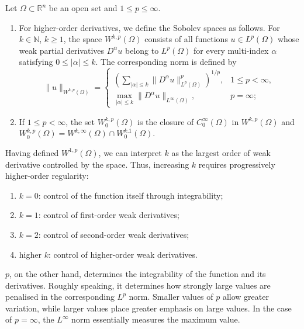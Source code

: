 \begin{definition}
    \label{def: Sobolev general k}
    Let $\Omega \subset \mathbb{R}^n$ be an open set and $1 \le p \le \infty$.\
\begin{enumerate}
    \item[(i)] For higher-order derivatives, we define the Sobolev spaces as follows. 
    For $k\in\mathbb{N}$, $k\geq1$, the space $W^{k,p}(\Omega)$ consists of all functions
    $u\in L^p(\Omega)$ whose weak partial derivatives $D^\alpha u$ belong to
    $L^p(\Omega)$ for every multi-index $\alpha$ satisfying $0\leq|\alpha|\leq k$.
    The corresponding norm is defined by
    \[
    \|u\|_{W^{k,p}(\Omega)}
    =
    \begin{cases}
    \displaystyle
    \left(
    \sum_{|\alpha|\leq k}
    \|D^\alpha u\|_{L^p(\Omega)}^p
    \right)^{1/p},
    & 1\leq p<\infty, \\[3ex]
    \displaystyle
    \max_{|\alpha|\leq k}
    \|D^\alpha u\|_{L^\infty(\Omega)},
    & p=\infty;
    \end{cases}
    \]
    
    \item[(ii)] If $1\leq p<\infty$, the set $W_0^{k,p}(\Omega)$ is the closure of $C_0^\infty(\Omega)$ in $W^{k,p}(\Omega)$ and $W_0^{k,p}(\Omega)= W^{k,\infty}(\Omega) \cap W_0^{k.1}(\Omega)$.
\end{enumerate}

\end{definition}

Having defined $W^{1,p}(\Omega)$, we can interpret $k$ as the largest order of weak derivative controlled by the space. Thus, increasing $k$ requires progressively higher-order regularity:

\begin{enumerate}
\item $k=0$: control of the function itself through integrability;
\item $k=1$: control of first-order weak derivatives;
\item $k=2$: control of second-order weak derivatives;
\item higher $k$: control of higher-order weak derivatives.
\end{enumerate}

$p$, on the other hand, determines the integrability of the function and its derivatives. Roughly speaking, it determines how strongly large values are penalised in the corresponding $L^p$ norm. Smaller values of $p$ allow greater variation, while larger values place greater emphasis on large values. In the case of $p=\infty$, the $L^\infty$ norm essentially measures the  maximum value.

